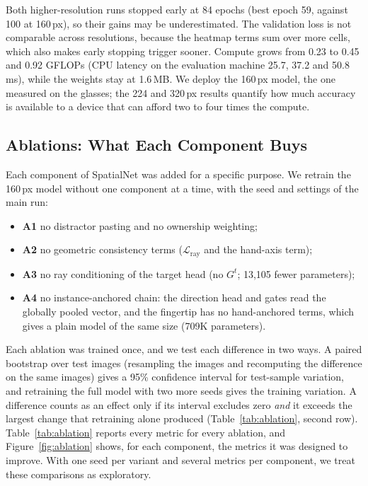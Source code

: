 Both higher-resolution runs stopped early at 84 epochs (best epoch 59, against 100 at 160\,px), so their gains may be underestimated. The validation loss is not comparable across resolutions, because the heatmap terms sum over more cells, which also makes early stopping trigger sooner. Compute grows from 0.23 to 0.45 and 0.92 GFLOPs (CPU latency on the evaluation machine 25.7, 37.2 and 50.8\,ms), while the weights stay at 1.6\,MB. We deploy the 160\,px model, the one measured on the glasses; the 224 and 320\,px results quantify how much accuracy is available to a device that can afford two to four times the compute.

\subsection{Ablations: What Each Component Buys}\label{sec:ablations}

Each component of SpatialNet was added for a specific purpose. We retrain the 160\,px model without one component at a time, with the seed and settings of the main run:
\begin{itemize}
\item \textbf{A1} no distractor pasting and no ownership weighting;
\item \textbf{A2} no geometric consistency terms ($\mathcal{L}_{\mathrm{ray}}$ and the hand-axis term);
\item \textbf{A3} no ray conditioning of the target head (no $G^t$; 13,105 fewer parameters);
\item \textbf{A4} no instance-anchored chain: the direction head and gates read the globally pooled vector, and the fingertip has no hand-anchored terms, which gives a plain model of the same size (709K parameters).
\end{itemize}
Each ablation was trained once, and we test each difference in two ways. A paired bootstrap over test images (resampling the images and recomputing the difference on the same images) gives a 95\% confidence interval for test-sample variation, and retraining the full model with two more seeds gives the training variation. A difference counts as an effect only if its interval excludes zero \emph{and} it exceeds the largest change that retraining alone produced (Table~\ref{tab:ablation}, second row). Table~\ref{tab:ablation} reports every metric for every ablation, and Figure~\ref{fig:ablation} shows, for each component, the metrics it was designed to improve. With one seed per variant and several metrics per component, we treat these comparisons as exploratory.

